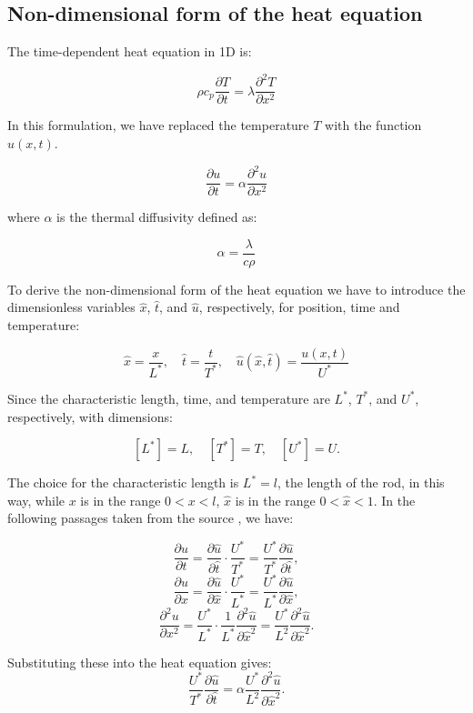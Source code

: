 \documentclass{article}
\begin{document}
\subsection{Non-dimensional form of the heat equation}

The time-dependent heat equation in 1D is:

\[
\rho c_p \frac{\partial T}{\partial t} = \lambda \frac{\partial^2 T}{\partial x^2}
\]

In this formulation, we have replaced the temperature \(T\) with the function \(u(x, t)\).

\[
\frac{\partial u}{\partial t} = \alpha \frac{\partial^2 u}{\partial x^2}
\]

where \(\alpha\) is the thermal diffusivity defined as:

\[
\alpha = \frac{\lambda}{c \rho} 
\]

To derive the non-dimensional form of the heat equation we have to introduce the dimensionless variables \(\hat{x}\), \(\hat{t}\),
and \(\hat{u}\), respectively, for position, time and temperature:

\[
\hat{x} = \frac{x}{L^*}, \quad \hat{t} = \frac{t}{T^*}, \quad \hat{u}(\hat{x}, \hat{t}) = \frac{u(x, t)}{U^*}
\]

Since the characteristic length, time, and temperature are \( L^* \), \( T^* \), and \( U^* \), respectively, with dimensions:

\[
[L^*] = L, \quad [T^*] = T, \quad [U^*] = U.
\]

The choice for the characteristic length is \( L^* = l \), the length of the rod, in this way, while \( x \) is in the range 
\( 0 < x < l \), \(\hat{x}\) is in the range \( 0 < \hat{x} < 1 \). In the following passages taken from the source \cite{HeatEquation}, we have:

\[
\frac{\partial u}{\partial t} = \frac{\partial \hat{u}}{\partial \hat{t}} \cdot \frac{U^*}{T^*} = \frac{U^*}{T^*} \frac{\partial \hat{u}}{\partial \hat{t}},
\]
\[
\frac{\partial u}{\partial x} = \frac{\partial \hat{u}}{\partial \hat{x}} \cdot \frac{U^*}{L^*} = \frac{U^*}{L^*} \frac{\partial \hat{u}}{\partial \hat{x}},
\]
\[
\frac{\partial^2 u}{\partial x^2} = \frac{U^*}{L^*} \cdot \frac{1}{L^*} \frac{\partial^2 \hat{u}}{\partial \hat{x}^2} = \frac{U^*}{L^2} \frac{\partial^2 \hat{u}}{\partial \hat{x}^2}.
\]

Substituting these into the heat equation gives:
\[
\frac{U^*}{T^*} \frac{\partial \hat{u}}{\partial \hat{t}} = \alpha \frac{U^*}{L^2} \frac{\partial^2 \hat{u}}{\partial \hat{x}^2}.
\]
\end{document}
